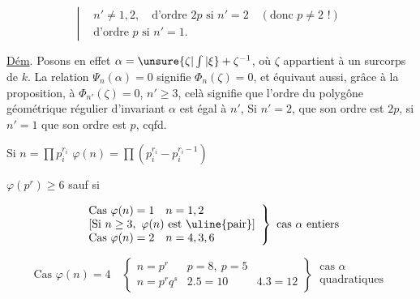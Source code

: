 
\[
\left|\begin{aligned}
&n'\ne1,2,\quad\text{d'ordre }2p\text{ si }n'=2\quad(\text{donc }p\ne2\text{ !})\\
&\text{d'ordre }p\text{ si }n'=1.
\end{aligned}\right.
\]

\uline{Dém}. Posons en effet $\alpha=\unsure{\zeta|\int|\xi}+\zeta^{-1}$, où $\zeta$ appartient à un surcorps de $k$. La relation $\Psi_n(\alpha)=0$ signifie $\Phi_n(\zeta)=0$, et équivaut aussi, grâce à la proposition, à $\Phi_{n'}(\zeta)=0$,     $n'\geq3$, celà signifie que l'ordre du polygône géométrique régulier d'invariant $\alpha$ est égal à $n'$, Si $n'=2$, que son ordre est $2p$, si $n'=1$ que son ordre est $p$, \hfill cqfd.



\deleted{$\varphi$} Si $n=\prod p_i^{r_i}$ \quad $\varphi(n)=\prod(p_i^{r_i}-p_i^{r_i-1})$

$\varphi(p^r)\geq6$ sauf si


\[
\left.\begin{array}{ll}
\text{Cas }\varphi(n)=1&n=1,2\\
\multicolumn{2}{l}{[\text{Si }n\geq3,\ \varphi(n)\text{ est \uline{pair}}]}\\
\text{Cas }\varphi(n)=2&n=4,3,6
\end{array}\right\}\ \text{cas }\alpha\text{ entiers}
\]

\[
\text{Cas }\varphi(n)=4\quad\left\{\begin{array}{lll}
n=p^r&p=8,\ p=5&\\
n=p^rq^s&2.5=10&4.3=12
\end{array}\right\}\ \begin{gathered}\text{cas }\alpha\\\text{quadratiques}\end{gathered}
\]


